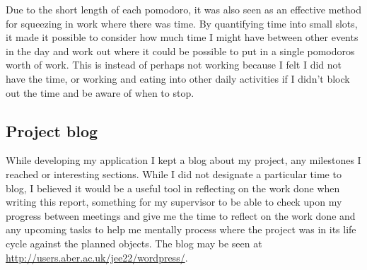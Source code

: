 Due to the short length of each pomodoro, it was also seen as an effective method for squeezing in work where there was time. By quantifying time into small slots, it made it possible to consider how much time I might have between other events in the day and work out where it could be possible to put in a single pomodoros worth of work. This is instead of perhaps not working because I felt I did not have the time, or working and eating into other daily activities if I didn't block out the time and be aware of when to stop.

\subsection{Project blog}
While developing my application I kept a blog about my project, any milestones I reached or interesting sections. While I did not designate a particular time to blog, I believed it would be a useful tool in reflecting on the work done when writing this report, something for my supervisor to be able to check upon my progress between meetings and give me the time to reflect on the work done and any upcoming tasks to help me mentally process where the project was in its life cycle against the planned objects. The blog may be seen at \url{http://users.aber.ac.uk/jee22/wordpress/}.
